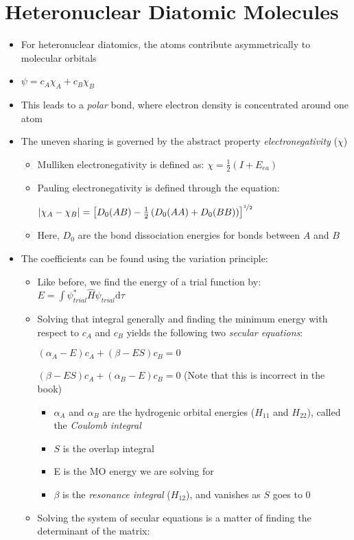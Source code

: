 \documentclass[12pt, openany, letterpaper]{memoir}
\begin{document}
\section{Heteronuclear Diatomic Molecules}
\begin{itemize}
	\item For heteronuclear diatomics, the atoms contribute asymmetrically to molecular orbitals
	\item $\psi = c_A\chi_A + c_B\chi_B$
	\item This leads to a \emph{polar} bond, where electron density is concentrated around one atom
	\item The uneven sharing is governed by the abstract property \emph{electronegativity} ($\chi$)
	\begin{itemize}
		\item Mulliken electronegativity is defined as: $\chi = \frac{1}{2}\left(I + E_{ea}\right)$
		\item Pauling electronegativity is defined through the equation:
		
		$\left|\chi_A-\chi_B\right| = \left[D_0(AB)-\frac{1}{2}\left(D_0(AA)+D_0(BB)\right)\right]^{\nicefrac{1}{2}}$
		\item Here, $D_0$ are the bond dissociation energies for bonds between $A$ and $B$
	\end{itemize}
	\item The coefficients can be found using the variation principle:
	\begin{itemize}
		\item Like before, we find the energy of a trial function by: $E = \displaystyle\int \psi^*_{trial}\hat{H}\psi_{trial}\mathrm{d}\tau$
		\item Solving that integral generally and finding the minimum energy with respect to $c_A$ and $c_B$ yields the following two \emph{secular equations}:
		
		$\left(\alpha_A-E\right)c_A + \left(\beta-ES\right)c_B=0$
		
		$\left(\beta-ES\right)c_A+\left(\alpha_B-E\right)c_B=0$ (Note that this is incorrect in the book)
		\begin{itemize}
			\item $\alpha_A$ and $\alpha_B$ are the hydrogenic orbital energies ($H_{11}$ and $H_{22}$), called the \emph{Coulomb integral}
			\item $S$ is the overlap integral
			\item E is the MO energy we are solving for
			\item $\beta$ is the \emph{resonance integral} ($H_{12}$), and vanishes as $S$ goes to $0$
		\end{itemize}
		\item Solving the system of secular equations is a matter of finding the determinant of the matrix:
		

\end{itemize}
\end{itemize}
\end{document}
